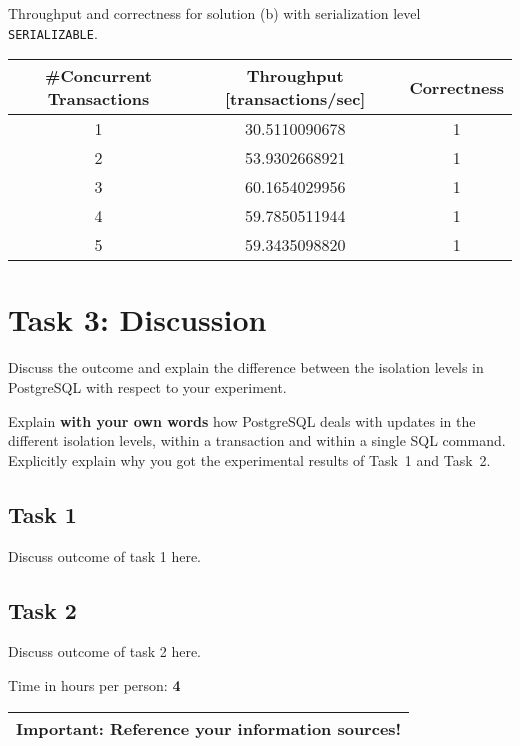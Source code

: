 \documentclass[11pt]{scrartcl}
\begin{document}
Throughput and correctness for solution (b) with serialization level
{\tt\small SERIALIZABLE}.

\bigskip

\begin{tabular}{c|c|c}
  \#Concurrent Transactions & Throughput [transactions/sec] & Correctness
  \\\hline
  1 & 30.5110090678 & 1\\
  2 & 53.9302668921 & 1\\
  3 & 60.1654029956 & 1\\
  4 & 59.7850511944 & 1\\
  5 & 59.3435098820 & 1\\    
\end{tabular}

\medskip

\section*{Task 3: Discussion}

Discuss the outcome and explain the difference between the isolation
levels in PostgreSQL with respect to your experiment.

Explain {\bf with your own words} how PostgreSQL deals with updates in
the different isolation levels, within a transaction and within a
single SQL command. Explicitly explain why you got the experimental
results of Task~1 and Task~2.

\subsection*{Task 1}

Discuss outcome of task 1 here.

\subsection*{Task 2}

Discuss outcome of task 2 here.

\bigskip

\noindent Time in hours per person: {\bf 4}

\bigskip

\begin{center}
  \begin{tabular}{c}
    \hline
    {\bf Important:} Reference your information sources!
    \\\hline
  \end{tabular}
\end{center}
\end{document}
